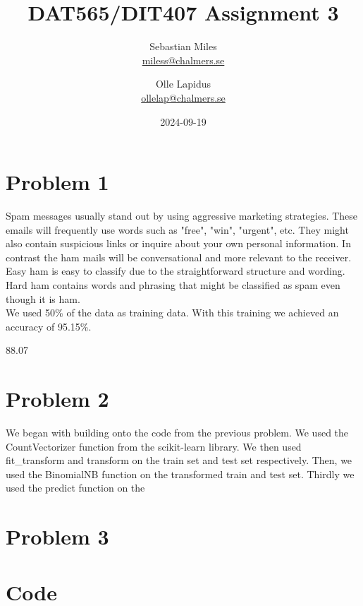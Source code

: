 \documentclass[a4paper]{article}
\begin{document}
\author{
  Sebastian Miles \\
  \href{mailto:miless@chalmers.se}{miless@chalmers.se}
  \and
  Olle Lapidus \\
  \href{mailto:ollelap@chalmers.se}{ollelap@chalmers.se}
}
\title{DAT565/DIT407 Assignment 3}
\date{2024-09-19}

\maketitle
\section*{Problem 1}
Spam messages usually stand out by using aggressive marketing strategies. These emails will frequently use words such as "free", "win", "urgent", etc. They might also contain suspicious links or inquire about your own personal information. In contrast the ham mails will be conversational and more relevant to the receiver. Easy ham is easy to classify due to the straightforward structure and wording. Hard ham contains words and phrasing that might be classified as spam even though it is ham.\\
We used 50\% of the data as training data. With this training we achieved an accuracy of 95.15\%.

88.07


\section*{Problem 2}
We began with building onto the code from the previous problem. We used the CountVectorizer function from the scikit-learn library. We then used fit\_transform and transform on the train set and test set respectively. Then, we used the BinomialNB function on the transformed train and test set. Thirdly we used the predict function on the 


\section*{Problem 3}

\begin{figure}[H]
  \begin{center}
    
    \caption{}
    \label{scatter2}
  \end{center}
\end{figure}

\printbibliography
\appendix

\section*{Code}
\label{app:excode}

\begin{lstlisting}

\end{lstlisting}
\end{document}
